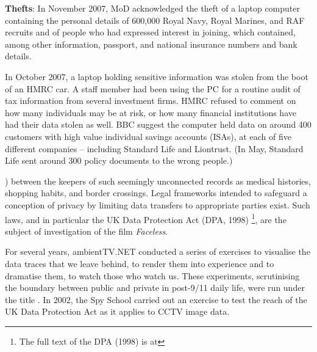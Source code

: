 {{{\bf Thefts}: In November 2007, MoD acknowledged the theft of a laptop computer
containing the personal details of 600,000 Royal Navy, Royal Marines,
and RAF recruits and of people who had expressed interest in joining,
which contained, among other information, passport, and national
insurance numbers and bank details.

In October 2007, a laptop holding sensitive information was stolen from
the boot of an HMRC car. A staff member had been using the PC for a
routine audit of tax information from several investment firms. HMRC
refused to comment on how many individuals may be at risk, or how many
financial institutions have had their data stolen as well. BBC suggest
the computer held data on around 400 customers with high value
individual savings accounts (ISAs), at each of five different companies
{--} including Standard Life and Liontrust. (In May, Standard Life sent
around 300 policy documents to the wrong people.)}) between the keepers of such
seemingly unconnected records as medical histories, shopping habits,
and border crossings. Legal frameworks intended to safeguard a
conception of privacy by limiting data transfers to appropriate parties
exist. Such laws, and in particular the UK Data Protection Act (DPA,
1998) \footnote{The full text of the DPA (1998) is at
}, are the subject of investigation of the film
{\em Faceless}.


For several years, ambientTV.NET conducted a series of exercises to
visualise the data traces that we leave behind, to render them into
experience and to dramatise them, to watch those who watch us. These
experiments, scrutinising the boundary between public and private in
post{}-9/11 daily life, were run under the title . In
2002, the Spy School carried out an exercise to test the reach of the
UK Data Protection Act as it applies to CCTV image data.


}
